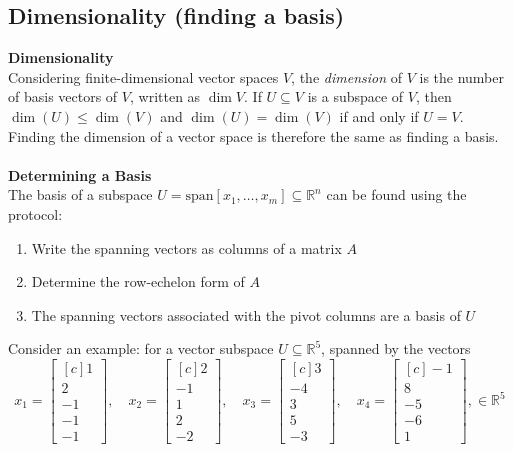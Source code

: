 \documentclass{report}
\begin{document}
\subsection{Dimensionality (finding a basis)} %
\textbf{Dimensionality}\\
Considering finite-dimensional vector spaces $V$, the \textit{dimension} of $V$ is the number
of basis vectors of $V$, written as $\dim{V}$. If $U\subseteq V$ is a subspace of $V$, then
$\dim(U)\leq\dim(V)$ and $\dim(U)=\dim(V)$ if and only if
$U=V$. Finding the dimension of a vector space is therefore the same as finding a basis.\\
\vspace{1mm}\\
\textbf{Determining a Basis}\\
The basis of a subspace $U=\text{span}[x_1,\ldots,x_m]\subseteq\mathbb{R}^n$ can be found using the 
protocol:
\begin{enumerate}
\item Write the spanning vectors as columns of a matrix $A$
\item Determine the row-echelon form of $A$
\item The spanning vectors associated with the pivot columns are a basis of $U$
\end{enumerate}
Consider an example: for a vector subspace $U\subseteq\mathbb{R}^5$, spanned by the vectors
\begin{equation*}
x_1=\begin{bmatrix*}[c]
1\\2\\-1\\-1\\-1
\end{bmatrix*},\quad
x_2=\begin{bmatrix*}[c]
2\\-1\\1\\2\\-2
\end{bmatrix*},\quad
x_3=\begin{bmatrix*}[c]
3\\-4\\3\\5\\-3
\end{bmatrix*},\quad
x_4=\begin{bmatrix*}[c]
-1\\8\\-5\\-6\\1
\end{bmatrix*},\in\mathbb{R}^5
\end{equation*}
\end{document}
